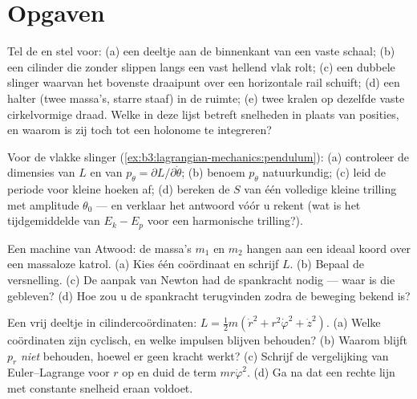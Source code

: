 \section{Opgaven}

\begin{exercise}[$\star$]\label{exo:b3:lagrangian-mechanics:1}
Tel de  en stel  voor: (a) een
deeltje aan de binnenkant van een vaste schaal; (b) een cilinder die
zonder slippen langs een vast hellend vlak rolt; (c) een dubbele slinger
waarvan het bovenste draaipunt over een horizontale rail schuift; (d) een
halter (twee massa's, starre staaf) in de ruimte; (e) twee kralen op
dezelfde vaste cirkelvormige draad. Welke  in deze lijst
betreft snelheden in plaats van posities, en waarom is zij toch tot een
holonome te integreren?
\end{exercise}

\begin{exercise}[$\star$]\label{exo:b3:lagrangian-mechanics:2}
Voor de vlakke slinger (\cref{ex:b3:lagrangian-mechanics:pendulum}):
(a) controleer de dimensies van $L$ en van $p_\theta =
\partial L/\partial\dot\theta$; (b) benoem $p_\theta$ natuurkundig; (c)
leid de periode voor kleine hoeken af; (d) bereken de  $S$ van één
volledige kleine trilling met amplitude $\theta_0$ --- en verklaar het
antwoord vóór u rekent (wat is het tijdgemiddelde van $E_k - E_p$ voor
een harmonische trilling?).
\end{exercise}

\begin{exercise}[$\star$]\label{exo:b3:lagrangian-mechanics:3}
Een machine van Atwood: de massa's $m_1$ en $m_2$ hangen aan een ideaal
koord over een massaloze katrol. (a) Kies één coördinaat en schrijf $L$.
(b) Bepaal de versnelling. (c) De aanpak van Newton had de spankracht
nodig --- waar is die gebleven? (d) Hoe zou u de spankracht terugvinden
zodra de beweging bekend is?
\end{exercise}

\begin{exercise}[$\star$]\label{exo:b3:lagrangian-mechanics:4}
Een vrij deeltje in cilindercoördinaten: $L = \tfrac12 m(\dot r^2 +
r^2\dot\varphi^2 + \dot z^2)$. (a) Welke coördinaten zijn cyclisch, en
welke impulsen blijven behouden? (b) Waarom blijft $p_r$ \emph{niet}
behouden, hoewel er geen kracht werkt? (c) Schrijf de vergelijking van
Euler--Lagrange voor $r$ op en duid de term $mr\dot\varphi^2$. (d) Ga na
dat een rechte lijn met constante snelheid eraan voldoet.
\end{exercise}

